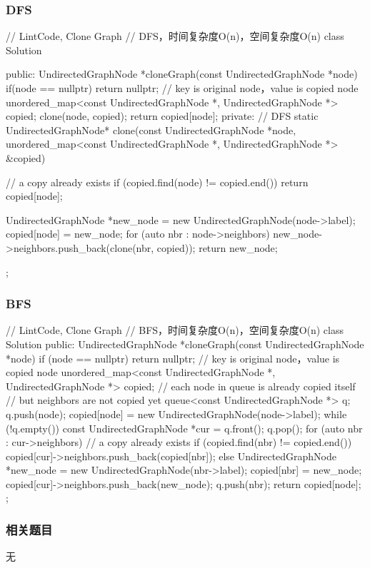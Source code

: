 \subsubsection{DFS}
\begin{Code}
// LintCode, Clone Graph
// DFS，时间复杂度O(n)，空间复杂度O(n)
class Solution {
public:
    UndirectedGraphNode *cloneGraph(const UndirectedGraphNode *node) {
        if(node == nullptr) return nullptr;
        // key is original node，value is copied node
        unordered_map<const UndirectedGraphNode *,
                            UndirectedGraphNode *> copied;
        clone(node, copied);
        return copied[node];
    }
private:
    // DFS
    static UndirectedGraphNode* clone(const UndirectedGraphNode *node,
            unordered_map<const UndirectedGraphNode *,
            UndirectedGraphNode *> &copied) {
        // a copy already exists
        if (copied.find(node) != copied.end()) return copied[node];

        UndirectedGraphNode *new_node = new UndirectedGraphNode(node->label);
        copied[node] = new_node;
        for (auto nbr : node->neighbors)
            new_node->neighbors.push_back(clone(nbr, copied));
        return new_node;
    }
};
\end{Code}


\subsubsection{BFS}
\begin{Code}
// LintCode, Clone Graph
// BFS，时间复杂度O(n)，空间复杂度O(n)
class Solution {
public:
    UndirectedGraphNode *cloneGraph(const UndirectedGraphNode *node) {
        if (node == nullptr) return nullptr;
        // key is original node，value is copied node
        unordered_map<const UndirectedGraphNode *,
                            UndirectedGraphNode *> copied;
        // each node in queue is already copied itself
        // but neighbors are not copied yet
        queue<const UndirectedGraphNode *> q;
        q.push(node);
        copied[node] = new UndirectedGraphNode(node->label);
        while (!q.empty()) {
            const UndirectedGraphNode *cur = q.front();
            q.pop();
            for (auto nbr : cur->neighbors) {
                // a copy already exists
                if (copied.find(nbr) != copied.end()) {
                    copied[cur]->neighbors.push_back(copied[nbr]);
                } else {
                    UndirectedGraphNode *new_node =
                            new UndirectedGraphNode(nbr->label);
                    copied[nbr] = new_node;
                    copied[cur]->neighbors.push_back(new_node);
                    q.push(nbr);
                }
            }
        }
        return copied[node];
    }
};
\end{Code}


\subsubsection{相关题目}
\begindot
\item 无
\myenddot
